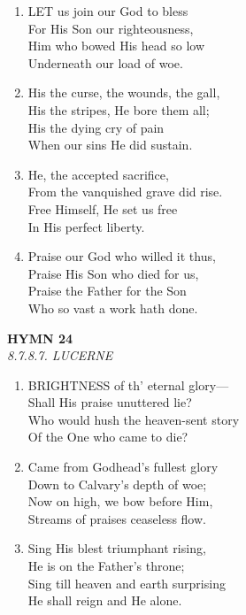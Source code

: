 \begin{enumerate}
    \item LET us join our God to bless \\
        For His Son our righteousness, \\
        Him who bowed His head so low \\
        Underneath our load of woe.

    \item His the curse, the wounds, the gall, \\
        His the stripes, He bore them all; \\
        His the dying cry of pain \\
        When our sins He did sustain.

    \item He, the accepted sacrifice, \\
        From the vanquished grave did rise. \\
        Free Himself, He set us free \\
        In His perfect liberty.

    \item Praise our God who willed it thus, \\
        Praise His Son who died for us, \\
        Praise the Father for the Son \\
        Who so vast a work hath done.

\end{enumerate}

\newpage
\begin{center}
    {\Large \textbf{HYMN 24}}
    \\
    \textit{8.7.8.7. LUCERNE}
\end{center}
\vspace{1em}

\begin{enumerate}
    \item BRIGHTNESS of th' eternal glory--- \\
        Shall His praise unuttered lie? \\
        Who would hush the heaven-sent story \\
        Of the One who came to die?

    \item Came from Godhead's fullest glory \\
        Down to Calvary's depth of woe; \\
        Now on high, we bow before Him, \\
        Streams of praises ceaseless flow.

    \item Sing His blest triumphant rising, \\
        He is on the Father's throne; \\
        Sing till heaven and earth surprising \\
        He shall reign and He alone.

\end{enumerate}

